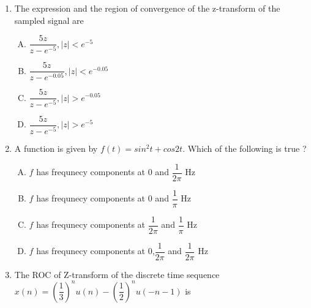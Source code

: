 \documentclass[journal,12pt,twocolumn]{IEEEtran}
\begin{document}
\begin{enumerate}
\begin{enumerate}[(A)]
\end{enumerate}

\item The expression and the region of convergence of the z-transform of the sampled signal are

\begin{enumerate}[(A)]

\item $ \dfrac{5z}{z-e^{-5}}, |z|<e^{-5}$

\item $ \dfrac{5z}{z-e^{-0.05}}, |z|<e^{-0.05}$

\item $ \dfrac{5z}{z-e^{-5}}, |z|>e^{-0.05}$

\item  $ \dfrac{5z}{z-e^{-5}}, |z|>e^{-5}$



\end{enumerate}

 


\item A function is given by $f(t)=sin^{2}t+cos2t.$ Which of the following is true ?

\begin{enumerate}[(A)]

\setlength\itemsep{2em}

\item $f$ has frequnecy components at 0 and $\dfrac{1}{2\pi}$ Hz
\item $f$ has frequnecy components at 0 and $\dfrac{1}{\pi}$ Hz
\item $f$ has frequnecy components at $\dfrac{1}{2\pi}$ and $\dfrac{1}{\pi}$ Hz
\item $f$ has frequnecy components at 0,$\dfrac{1}{2\pi}$ and $\dfrac{1}{2\pi}$ Hz


\end{enumerate}

\item The ROC of Z-transform of the discrete time sequence $x(n)=(\dfrac{1}{3})^{n}u(n)-(\dfrac{1}{2})^{n}u(-n-1)$ is

\begin{enumerate}[(A)]
\end{enumerate}
\end{enumerate}
\end{document}
